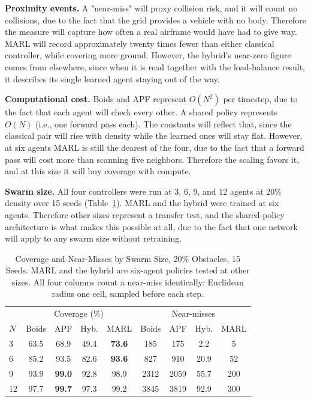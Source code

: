 \documentclass[a4paper, 10pt, conference]{ieeeconf}
\begin{document}
\textbf{Proximity events.} A "near-miss" will proxy collision risk,
and it will count no collisions, due to the fact that the grid
provides a vehicle with no body. Therefore the measure will capture
how often a real airframe would have had to give way. MARL will record
approximately twenty times fewer than either classical controller,
while covering more ground. However, the hybrid's near-zero figure
comes from elsewhere, since when it is read together with the
load-balance result, it describes its single learned agent staying out
of the way.

\textbf{Computational cost.} Boids and APF represent $O(N^2)$ per
timestep, due to the fact that each agent will check every other. A
shared policy represents $O(N)$ (i.e., one forward pass each). The
constants will reflect that, since the classical pair will rise with
density while the learned ones will stay flat. However, at six agents
MARL is still the dearest of the four, due to the fact that a forward
pass will cost more than scanning five neighbors. Therefore the
scaling favors it, and at this size it will buy coverage with compute.

\textbf{Swarm size.} All four controllers were run at 3, 6, 9, and 12
agents at 20\% density over 15 seeds (Table~\ref{tab:swarm}). MARL and
the hybrid were trained at six agents. Therefore other sizes represent
a transfer test, and the shared-policy architecture is what makes this
possible at all, due to the fact that one network will apply to any
swarm size without retraining.

\begin{table}[htb]
\centering
\caption{Coverage and Near-Misses by Swarm Size, 20\% Obstacles,
15 Seeds. MARL and the hybrid are six-agent policies tested at other
sizes. All four columns count a near-miss identically: Euclidean
radius one cell, sampled before each step.}
\label{tab:swarm}
\scriptsize
\setlength{\tabcolsep}{3pt}
\begin{tabular}{lcccc|cccc}
\toprule
& \multicolumn{4}{c|}{Coverage (\%)} & \multicolumn{4}{c}{Near-misses} \\
$N$ & Boids & APF & Hyb. & MARL & Boids & APF & Hyb. & MARL \\
\midrule
3  & 63.5 & 68.9 & 49.4 & \textbf{73.6} & 185  & 175  & 2.2  & 5    \\
6  & 85.2 & 93.5 & 82.6 & \textbf{93.6} & 827  & 910  & 20.9 & 52   \\
9  & 93.9 & \textbf{99.0} & 92.8 & 98.9 & 2312 & 2059 & 55.7 & 200  \\
12 & 97.7 & \textbf{99.7} & 97.3 & 99.2 & 3845 & 3819 & 92.9 & 300  \\
\bottomrule
\end{tabular}
\end{table}
\end{document}
